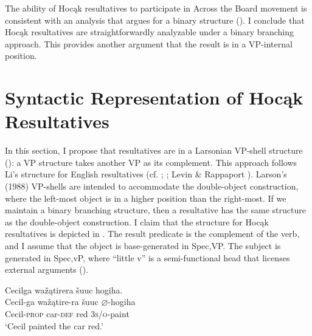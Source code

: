 \documentclass[output=paper]{LSP/langsci}
\begin{document}
The ability of Hocąk resultatives to participate in Across the Board movement is consistent with an analysis that argues for a binary structure (\citealt{Bowers1997}). I conclude that Hocąk resultatives are straightforwardly analyzable under a binary branching approach. This provides another argument that the result is in a VP-internal position.
 
\section{Syntactic Representation of Hocąk Resultatives}\label{sec:rosen:4}
 
In this section, I propose that resultatives are in a Larsonian VP-shell structure (\citealt{Larson1988}): a VP structure takes another VP as its complement. This approach follows Li's  structure for English resultatives (cf. \citealt{Hoekstra1988};  \citealt{CarrierRandall1992}; Levin \& Rappaport \citealt{Hovav1995}). Larson's (1988) VP-shells are intended to accommodate the double-object construction, where the left-most object is in a higher position than the right-most. If we maintain a binary branching structure, then a resultative has the same structure as the double-object construction. I claim that the structure for Hocąk resultatives is depicted in . The result predicate is the complement of the verb, and I assume that the object is base-generated in Spec,VP. The subject is generated in Spec,vP, where ``little v'' is a semi-functional head that licenses external arguments (\citealt{Chomsky1995}).

\begin{exe}
\ex\label{ex:rosen:27}
\begin{xlist}

\ex \glll Cecilga wažątirera šuuc hogiha. \\
Cecil-ga  wažątire-ra šuuc {$\varnothing$}-hogiha \\
Cecil-\textsc{prop} car-\textsc{def} red \textsc{3s/o}-paint\\
\glt `Cecil painted the car red.'

\ex 
{\hspace{1em}}\newline
{}
\end{xlist}
\end{exe}
\end{document}
